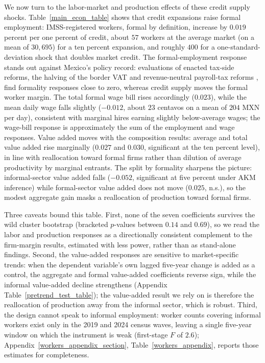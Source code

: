 \documentclass[12pt]{article}
\begin{document}
We now turn to the labor-market and production effects of these credit supply shocks. Table~\ref{main_econ_table} shows that credit expansions raise formal employment: IMSS-registered workers, formal by definition, increase by $0.019$ percent per one percent of credit, about $57$ workers at the average market (on a mean of $30{,}695$) for a ten percent expansion, and roughly $400$ for a one-standard-deviation shock that doubles market credit. The formal-employment response stands out against Mexico's policy record: evaluations of enacted tax-side reforms, the halving of the border VAT \citep{campos2020effects} and revenue-neutral payroll-tax reforms \citep{bobba2021labor}, find formality responses close to zero, whereas credit supply moves the formal worker margin. The total formal wage bill rises accordingly ($0.023$), while the mean daily wage falls slightly ($-0.012$, about $23$ centavos on a mean of $204$ MXN per day), consistent with marginal hires earning slightly below-average wages; the wage-bill response is approximately the sum of the employment and wage responses. Value added moves with the composition results: average and total value added rise marginally ($0.027$ and $0.030$, significant at the ten percent level), in line with reallocation toward formal firms rather than dilution of average productivity by marginal entrants. The split by formality sharpens the picture: informal-sector value added falls ($-0.052$, significant at five percent under AKM inference) while formal-sector value added does not move ($0.025$, n.s.), so the modest aggregate gain masks a reallocation of production toward formal firms.

Three caveats bound this table. First, none of the seven coefficients survives the wild cluster bootstrap (bracketed $p$-values between $0.14$ and $0.69$), so we read the labor and production responses as a directionally consistent complement to the firm-margin results, estimated with less power, rather than as stand-alone findings. Second, the value-added responses are sensitive to market-specific trends: when the dependent variable's own lagged five-year change is added as a control, the aggregate and formal value-added coefficients reverse sign, while the informal value-added decline strengthens (Appendix Table~\ref{pretrend_test_table}); the value-added result we rely on is therefore the reallocation of production away from the informal sector, which is robust. Third, the design cannot speak to informal employment: worker counts covering informal workers exist only in the 2019 and 2024 census waves, leaving a single five-year window on which the instrument is weak (first-stage $F$ of $2.6$); Appendix~\ref{workers_appendix_section}, Table~\ref{workers_appendix}, reports those estimates for completeness.
\end{document}
